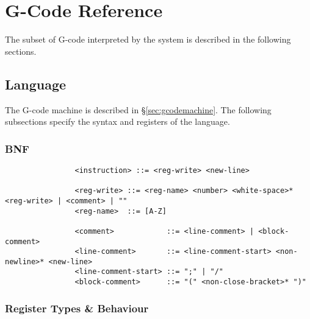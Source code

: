 \chapter{G-Code Reference}
	
	The subset of G-code interpreted by the system is described in the following
	sections.
	
	\section{Language}
		
		The G-code machine is described in \S\ref{sec:gcodemachine}. The following
		subsections specify the syntax and registers of the language.
		
		\subsection{BNF}
			
			\label{sec:gcodebnf}
			
			\begin{verbatim}
				<instruction> ::= <reg-write> <new-line>
				
				<reg-write> ::= <reg-name> <number> <white-space>* <reg-write> | <comment> | ""
				<reg-name>  ::= [A-Z]
				
				<comment>            ::= <line-comment> | <block-comment>
				<line-comment>       ::= <line-comment-start> <non-newline>* <new-line> 
				<line-comment-start> ::= ";" | "/"
				<block-comment>      ::= "(" <non-close-bracket>* ")"
			\end{verbatim}
		
		\subsection{Register Types \& Behaviour}
			
